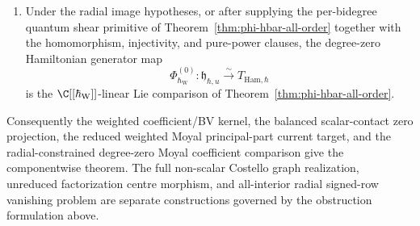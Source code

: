 \documentclass[11pt]{memoir}
\begin{document}
\begin{thm}
\begin{enumerate}
      continuity.
    \item Under the radial image hypotheses, or after supplying the
      per-bidegree quantum shear primitive of
      Theorem~\ref{thm:phi-hbar-all-order} together with the
      homomorphism, injectivity, and pure-power clauses, the degree-zero
      Hamiltonian generator map
	      \[
	        \Phi_{\hbar_{\mathrm{W}}}^{(0)}\colon
	        \mathfrak h_{\hbar,u}\xrightarrow{\sim}T_{\mathrm{Ham},\hbar}
	      \]
      is the \(\C[[\hbar_{\mathrm{W}}]]\)-linear Lie comparison of
      Theorem~\ref{thm:phi-hbar-all-order}.
  \end{enumerate}
  Consequently the weighted coefficient/BV kernel, the balanced
  scalar-contact zero projection, the reduced weighted Moyal
  principal-part current target, and the radial-constrained degree-zero Moyal
  coefficient comparison give the componentwise theorem.
  The full non-scalar Costello graph realization, unreduced factorization
  centre morphism, and all-interior radial signed-row vanishing problem are separate constructions
  governed by the obstruction formulation above.
\end{thm}
\end{document}
